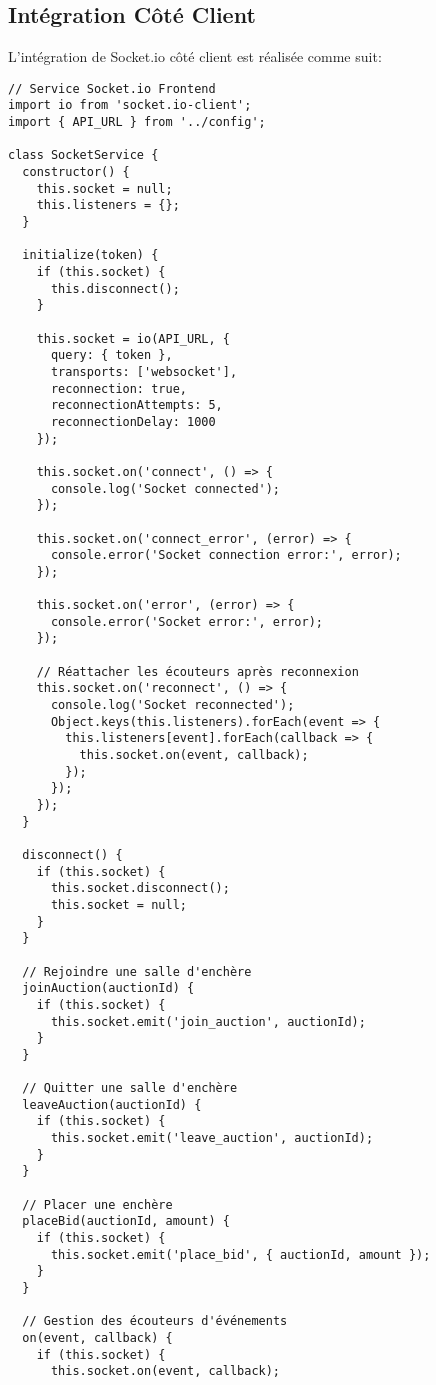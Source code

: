 \subsection{Intégration Côté Client}

L'intégration de Socket.io côté client est réalisée comme suit:

\begin{verbatim}
// Service Socket.io Frontend
import io from 'socket.io-client';
import { API_URL } from '../config';

class SocketService {
  constructor() {
    this.socket = null;
    this.listeners = {};
  }
  
  initialize(token) {
    if (this.socket) {
      this.disconnect();
    }
    
    this.socket = io(API_URL, {
      query: { token },
      transports: ['websocket'],
      reconnection: true,
      reconnectionAttempts: 5,
      reconnectionDelay: 1000
    });
    
    this.socket.on('connect', () => {
      console.log('Socket connected');
    });
    
    this.socket.on('connect_error', (error) => {
      console.error('Socket connection error:', error);
    });
    
    this.socket.on('error', (error) => {
      console.error('Socket error:', error);
    });
    
    // Réattacher les écouteurs après reconnexion
    this.socket.on('reconnect', () => {
      console.log('Socket reconnected');
      Object.keys(this.listeners).forEach(event => {
        this.listeners[event].forEach(callback => {
          this.socket.on(event, callback);
        });
      });
    });
  }
  
  disconnect() {
    if (this.socket) {
      this.socket.disconnect();
      this.socket = null;
    }
  }
  
  // Rejoindre une salle d'enchère
  joinAuction(auctionId) {
    if (this.socket) {
      this.socket.emit('join_auction', auctionId);
    }
  }
  
  // Quitter une salle d'enchère
  leaveAuction(auctionId) {
    if (this.socket) {
      this.socket.emit('leave_auction', auctionId);
    }
  }
  
  // Placer une enchère
  placeBid(auctionId, amount) {
    if (this.socket) {
      this.socket.emit('place_bid', { auctionId, amount });
    }
  }
  
  // Gestion des écouteurs d'événements
  on(event, callback) {
    if (this.socket) {
      this.socket.on(event, callback);
      

\end{verbatim}
